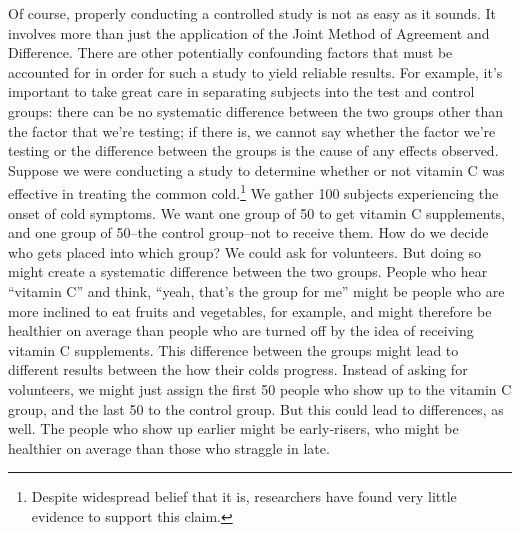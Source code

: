 Of course, properly conducting a controlled study is not as easy as it sounds. It involves more than
just the application of the Joint Method of Agreement and Difference. There are other potentially
confounding factors that must be accounted for in order for such a study to yield reliable results.
For example, it's important to take great care in separating subjects into the test and control groups:
there can be no systematic difference between the two groups other than the factor that we're
testing; if there is, we cannot say whether the factor we're testing or the difference between the
groups is the cause of any effects observed. Suppose we were conducting a study to determine
whether or not vitamin C was effective in treating the common 
cold.\footnote{Despite widespread belief that it is, researchers have found very little evidence 
to support this claim.}
We gather 100 subjects
experiencing the onset of cold symptoms. We want one group of 50 to get vitamin C supplements,
and one group of 50--the control group--not to receive them. How do we decide who gets placed
into which group? We could ask for volunteers. But doing so might create a systematic difference
between the two groups. People who hear ``vitamin C'' and think, ``yeah, that's the group for me''
might be people who are more inclined to eat fruits and vegetables, for example, and might
therefore be healthier on average than people who are turned off by the idea of receiving vitamin
C supplements. This difference between the groups might lead to different results between the how
their colds progress. Instead of asking for volunteers, we might just assign the first 50 people who
show up to the vitamin C group, and the last 50 to the control group. But this could lead to
differences, as well. The people who show up earlier might be early-risers, who might be healthier
on average than those who straggle in late.

